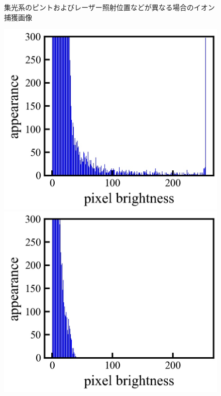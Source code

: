 \begin{figure}[h]
\begin{center}
\begin{minipage}{0.3\linewidth}
	\end{minipage}
	\end{center}
	\caption{集光系のピントおよびレーザー照射位置などが異なる場合のイオン捕獲画像}
	\label{fig:ionimage}
\end{figure}

\begin{figure}[h]
	\begin{center}
		\begin{minipage}{0.3\linewidth}
			\includegraphics[width=0.98\columnwidth]{./theory/figure/5/hist_0.jpg}
		\end{minipage}
		\begin{minipage}{0.3\linewidth}
			\includegraphics[width=0.98\columnwidth]{./theory/figure/5/hist_1.jpg}

\end{minipage}
\end{center}
\end{figure}
